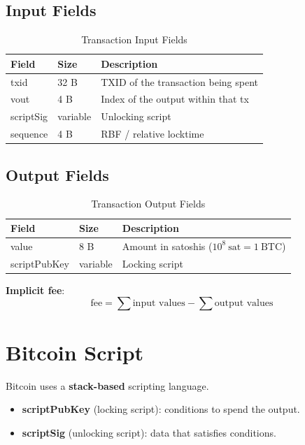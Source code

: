 \documentclass[12pt,a4paper,openany]{book}
\theoremstyle{definition}
\theoremstyle{plain}
\theoremstyle{remark}
\begin{document}
\subsection{Input Fields}

\begin{table}[h]
\centering
\caption{Transaction Input Fields}
\begin{tabular}{lll}
\toprule
\textbf{Field} & \textbf{Size} & \textbf{Description} \\
\midrule
txid       & 32 B & TXID of the transaction being spent \\
vout       & 4 B & Index of the output within that tx \\
scriptSig  & variable & Unlocking script \\
sequence   & 4 B & RBF / relative locktime \\
\bottomrule
\end{tabular}
\end{table}

\subsection{Output Fields}

\begin{table}[h]
\centering
\caption{Transaction Output Fields}
\begin{tabular}{lll}
\toprule
\textbf{Field} & \textbf{Size} & \textbf{Description} \\
\midrule
value       & 8 B & Amount in satoshis ($10^8\ \text{sat}=1\ \text{BTC}$) \\
scriptPubKey & variable & Locking script \\
\bottomrule
\end{tabular}
\end{table}

\textbf{Implicit fee}:
\[
  \text{fee} = \sum\text{input values} - \sum\text{output values}
\]

\section{Bitcoin Script}

Bitcoin uses a \textbf{stack-based} scripting language.

\begin{itemize}
  \item \textbf{scriptPubKey} (locking script): conditions to spend the output.
  \item \textbf{scriptSig} (unlocking script): data that satisfies conditions.
\end{itemize}
\end{document}
